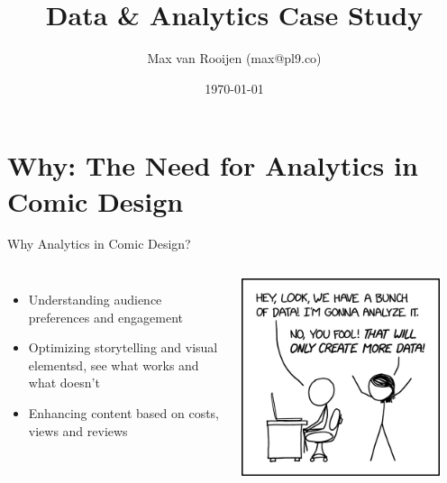 \documentclass{beamer}
\title{Data \& Analytics Case Study}
\author{Max van Rooijen (max@pl9.co)}
\date{\today}
\begin{document}
\frame{\titlepage}

\section{Why: The Need for Analytics in Comic Design}
\begin{frame}{Why Analytics in Comic Design?}
    \begin{columns}
        \begin{itemize}
            \item Understanding audience preferences and engagement
            \item Optimizing storytelling and visual elementsd, see what works and what doesn't
            \item Enhancing content based on costs, views and reviews
        \end{itemize}
        \centering
        \includegraphics[width=0.9\textwidth]{../screenshots/data_trap_2x.png}
    \end{columns}
\end{frame}
\end{document}
